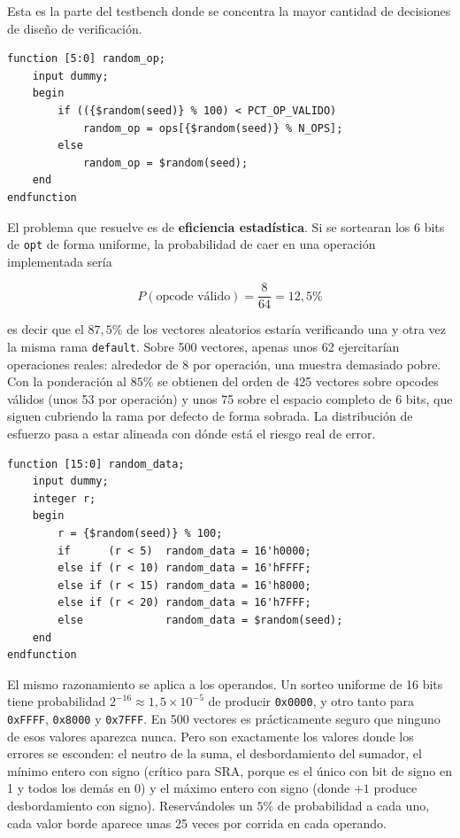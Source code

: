 \documentclass[12pt,a4paper]{article}
\begin{document}
Esta es la parte del testbench donde se concentra la mayor cantidad de decisiones
de diseño de verificación.

\begin{lstlisting}[caption={Sorteo de opcode con ponderación.},label={lst:randomop}]
function [5:0] random_op;
    input dummy;
    begin
        if (({$random(seed)} % 100) < PCT_OP_VALIDO)
            random_op = ops[{$random(seed)} % N_OPS];
        else
            random_op = $random(seed);
    end
endfunction
\end{lstlisting}

El problema que resuelve es de \textbf{eficiencia estadística}. Si se sortearan
los 6 bits de \texttt{opt} de forma uniforme, la probabilidad de caer en una
operación implementada sería

\[
P(\text{opcode válido}) = \frac{8}{64} = 12{,}5\%
\]

es decir que el $87{,}5\%$ de los vectores aleatorios estaría verificando una y
otra vez la misma rama \texttt{default}. Sobre 500 vectores, apenas unos 62
ejercitarían operaciones reales: alrededor de 8 por operación, una muestra
demasiado pobre. Con la ponderación al $85\%$ se obtienen del orden de 425
vectores sobre opcodes válidos (unos 53 por operación) y unos 75 sobre el
espacio completo de 6 bits, que siguen cubriendo la rama por defecto de forma
sobrada. La distribución de esfuerzo pasa a estar alineada con dónde está el
riesgo real de error.

\begin{lstlisting}[caption={Sorteo de datos con sesgo hacia valores borde.},label={lst:randomdata}]
function [15:0] random_data;
    input dummy;
    integer r;
    begin
        r = {$random(seed)} % 100;
        if      (r < 5)  random_data = 16'h0000;
        else if (r < 10) random_data = 16'hFFFF;
        else if (r < 15) random_data = 16'h8000;
        else if (r < 20) random_data = 16'h7FFF;
        else             random_data = $random(seed);
    end
endfunction
\end{lstlisting}

El mismo razonamiento se aplica a los operandos. Un sorteo uniforme de 16 bits
tiene probabilidad $2^{-16} \approx 1{,}5 \times 10^{-5}$ de producir
\texttt{0x0000}, y otro tanto para \texttt{0xFFFF}, \texttt{0x8000} y
\texttt{0x7FFF}. En 500 vectores es prácticamente seguro que ninguno de esos
valores aparezca nunca. Pero son exactamente los valores donde los errores se
esconden: el neutro de la suma, el desbordamiento del sumador, el mínimo entero
con signo (crítico para SRA, porque es el único con bit de signo en 1 y todos
los demás en 0) y el máximo entero con signo (donde $+1$ produce desbordamiento
con signo). Reservándoles un $5\%$ de probabilidad a cada uno, cada valor borde
aparece unas 25 veces por corrida en cada operando.
\end{document}
